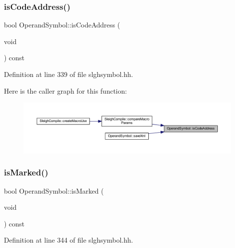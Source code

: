 \subsubsection{\texorpdfstring{isCodeAddress()}{isCodeAddress()}}
{\footnotesize\ttfamily bool Operand\+Symbol\+::is\+Code\+Address (\begin{DoxyParamCaption}\item[{void}]{ }\end{DoxyParamCaption}) const\hspace{0.3cm}{\ttfamily [inline]}}



Definition at line 339 of file slghsymbol.\+hh.

Here is the caller graph for this function\+:
\nopagebreak
\begin{figure}[H]
\begin{center}
\leavevmode
\includegraphics[width=350pt]{class_operand_symbol_afceafc766167e655252176850067b48b_icgraph}
\end{center}
\end{figure}
\mbox{\label{class_operand_symbol_a284c4038e0c1de1edee67f872b7debc9}} 
\subsubsection{\texorpdfstring{isMarked()}{isMarked()}}
{\footnotesize\ttfamily bool Operand\+Symbol\+::is\+Marked (\begin{DoxyParamCaption}\item[{void}]{ }\end{DoxyParamCaption}) const\hspace{0.3cm}{\ttfamily [inline]}}



Definition at line 344 of file slghsymbol.\+hh.

